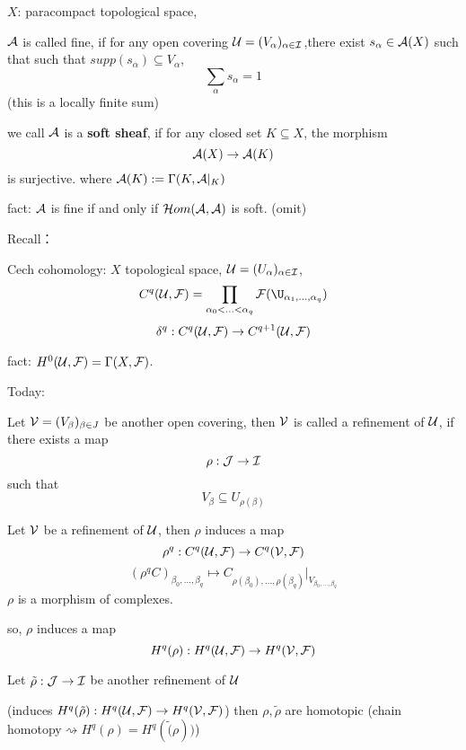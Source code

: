 $X$: paracompact topological space,

\begin{definition}
$\mathcal{A}$ is called fine, if for any open covering
$\mathcal{U}=(V_{\alpha})_{\alpha\in\mathcal{I}}$,there exist
$s_{\alpha}\in\mathcal{A}(X)$
such that such that $supp(s_{\alpha})\subseteq V_{\alpha}$,
$$\sum_{\alpha}s_{\alpha}=1$$
(this is a locally finite sum)
\end{definition}

\begin{rem}
we call $\mathcal{A}$ is a \textbf{soft sheaf},
if for any closed set $K\subseteq X$,
the morphism
$$\mathcal{A}(X)\to \mathcal{A}(K)$$
is surjective.
where $\mathcal{A}(K):=\Gamma(K,\mathcal{A}|_K)$
\end{rem}

fact: $\mathcal{A}$ is fine if and only if
$\mathcal{H} om(\mathcal{A},\mathcal{A})$ is soft.
(omit)

Recall：

Cech cohomology: $X$ topological space,
$\mathcal{U}=(U_{\alpha})_{\alpha\in\mathcal{I}}$,
$$C^q(\mcalU,\mcalF)=
\prod_{\alpha_0<...<\alpha_q}\mcalF(\U_{\alpha_1,...,\alpha_q})$$
$$\delta^q:C^q(\mathcal{U},\mathcal{F})\to C^{q+1}(\mathcal{U},\mathcal{F})$$

fact: $H^0(\mathcal{U},\mathcal{F})=\Gamma(X,\mathcal{F})$.

Today:

\begin{definition}
Let $\mathcal{V}=(V_{\beta})_{\beta\in J}$ be another open covering,
then $\mathcal{V}$ is called a refinement of $\mathcal{U}$, if there exists a map
$$\rho:\mathcal{J}\to\mathcal{I}$$
such that
$$V_{\beta}\subseteq U_{\rho(\beta)}$$
\end{definition}

\begin{prop}
Let $\mathcal{V}$ be a refinement of $\mathcal{U}$, then $\rho$ induces a map
$$\rho^q:C^q(\mathcal{U},\mathcal{F})\to C^q(\mathcal{V},\mathcal{F})$$
$$(\rho^qC)_{\beta_0,...,\beta_q}\mapsto
C_{\rho(\beta_0),...,\rho(\beta_q)}|_{V_{\beta_0,...,\beta_q}}$$
$\rho$ is a morphism of complexes.
\end{prop}

so, $\rho$ induces a map
$$H^q(\rho):H^q(\mathcal{U},\mathcal{F})\to H^q(\mathcal{V},\mathcal{F})$$

Let $\tilde{\rho}:\mathcal{J}\to\mathcal{I}$ be another refinement of $\mathcal{U}$

(induces $H^q(\tilde{\rho}):H^q(\mathcal{U},\mathcal{F})\to H^q(\mathcal{V},\mathcal{F})$)
then $\rho,\tilde{\rho}$ are homotopic
(chain homotopy$\rightsquigarrow H^q(\rho)=H^q(\tilde(\rho))$)

